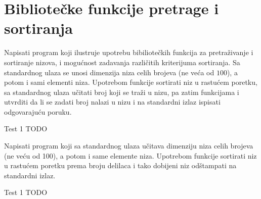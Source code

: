 
\section{Bibliotečke funkcije pretrage i sortiranja}
\begin{Exercise}[label=517]
  Napisati program koji ilustruje upotrebu bibiliotečkih funkcija za
  pretraživanje i sortiranje nizova, i mogućnost zadavanja različitih
  kriterijuma sortiranja. Sa standardnog ulaza se unosi dimenzija niza
  celih brojeva (ne veća od $100$), a potom i sami elementi
  niza. Upotrebom funkcije  sortirati niz u rastućem
  poretku, sa standardnog ulaza učitati broj koji se traži u nizu, pa
  zatim funkcijama  i  utvrditi da li se
  zadati broj nalazi u nizu i na standardni izlaz ispisati
  odgovarajuću poruku.
  
\begin{miditest}
\begin{test}{Test 1}
TODO
\end{test}
\end{miditest}
  
\end{Exercise}

\begin{Exercise}[label=518]
  Napisati program koji sa standardnog ulaza učitava dimenziju niza
  celih brojeva (ne veću od 100), a potom i same elemente
  niza. Upotrebom funkcije  sortirati niz u rastućem
  poretku prema broju delilaca i tako dobijeni niz odštampati na
  standardni izlaz.
  
\begin{miditest}
\begin{test}{Test 1}
TODO
\end{test}
\end{miditest}
  
\end{Exercise}

